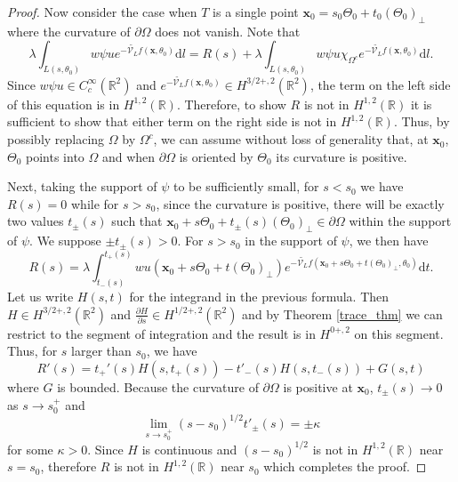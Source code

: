 \documentclass[10pt,a4paper]{amsart}
\newcommand{\dd}{\mathrm{d}}  %
\newcommand{\vx}{{\mathbf{x}}}
\begin{document}
\begin{proof}
Now consider the case when $T$ is a single point $\vx_0 = s_0 \Theta_0 + t_0 (\Theta_0)_\perp$ where the curvature of $\partial \Omega$ does not vanish. Note that
\[
\lambda \int_{L(s,\theta_0)} w \psi u e^{-\widetilde{\mathcal{V}_{L}}f(\vx,\theta_0)} \dd l = R(s) + \lambda \int_{L(s,\theta_0)} w \psi u \chi_{\Omega^c} e^{-\widetilde{\mathcal{V}_{L}}f(\vx,\theta_0)} \dd l.
\]
Since $w \psi u \in C_c^\infty(\mathbb{R}^2)$ and $e^{-\widetilde{\mathcal{V}_{L}}f(\vx,\theta_0)} \in H^{3/2+,2}(\mathbb{R}^2)$, the term on the left side of this equation is in $H^{1,2}(\mathbb{R})$. Therefore, to show $R$ is not in $H^{1,2}(\mathbb{R})$ it is sufficient to show that either term on the right side is not in $H^{1,2}(\mathbb{R})$. Thus, by possibly replacing $\Omega$ by $\Omega^c$, we can assume without loss of generality that, at $\vx_0$, $\Theta_0$ points into $\Omega$ and when $\partial \Omega$ is oriented by $\Theta_0$ its curvature is positive.

Next, taking the support of $\psi$ to be sufficiently small, for $s<s_0$ we have $R(s) = 0$ while for $s>s_0$, since the curvature is positive, there will be exactly two values $t_\pm(s)$ such that $\vx_0 + s \Theta_0 + t_\pm(s) (\Theta_0)_\perp \in \partial \Omega$ within the support of $\psi$. We suppose $\pm t_\pm(s)>0$. For $s>s_0$ in the support of $\psi$, we then have
\[
R(s) = \lambda \int_{t_-(s)}^{t_+(s)} wu(\vx_0 + s  \Theta_0 + t (\Theta_0)_\perp) e^{-\widetilde{\mathcal{V}_{L}}f(\vx_0 + s  \Theta_0 + t (\Theta_0)_\perp,\theta_0)}\dd t.
\]
Let us write $H(s,t)$ for the integrand in the previous formula. Then $H \in H^{3/2+,2}(\mathbb{R}^2)$ and $\frac{\partial H}{\partial s} \in H^{1/2+,2}(\mathbb{R}^2)$ and by Theorem \ref{trace_thm} we can restrict to the segment of integration and the result is in $H^{0+,2}$ on this segment. Thus, for $s$ larger than $s_0$, we have
\[
R'(s) = t_+'(s) H(s,t_+(s)) - t'_-(s) H(s,t_-(s)) + G(s,t)
\]
where $G$ is bounded. Because the curvature of $\partial \Omega$ is positive at $\vx_0$, $t_\pm(s) \rightarrow 0$ as $s \rightarrow s_0^+$ and
\[
\lim_{s\rightarrow s_0^+} (s-s_0)^{1/2} t'_{\pm}(s) = \pm \kappa
\]
for some $\kappa > 0$. Since $H$ is continuous and $(s-s_0)^{1/2}$ is not in $H^{1,2}(\mathbb{R})$ near $s = s_0$, therefore $R$ is not in $H^{1,2}(\mathbb{R})$ near $s_0$ which completes the proof.
\end{proof}
\end{document}

